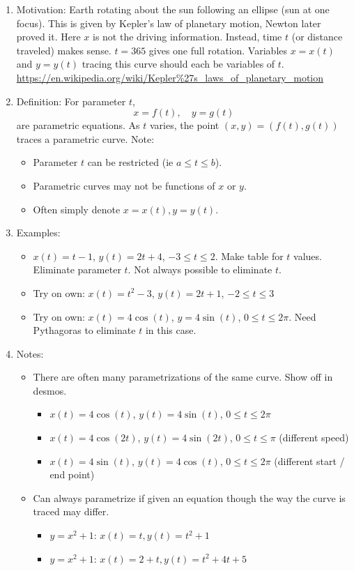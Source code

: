 \documentclass{article}
\begin{document}
\begin{enumerate}
\item Motivation: Earth rotating about the sun following an ellipse (sun at one focus). This is given by Kepler's law of planetary motion, Newton later proved it. Here $x$ is not the driving information. Instead, time $t$ (or distance traveled) makes sense. $t=365$ gives one full rotation. Variables $x=x(t)$ and $y=y(t)$ tracing this curve should each be variables of $t$.
\url{https://en.wikipedia.org/wiki/Kepler%27s_laws_of_planetary_motion}

\item Definition: For parameter $t$, 
\[
x = f(t), \quad y=g(t)
\]
are parametric equations. As $t$ varies, the point $(x,y)=(f(t),g(t))$ traces a parametric curve. Note:
\begin{itemize} 
\item Parameter $t$ can be restricted (ie $a \leq t \leq b$).
\item Parametric curves may not be functions of $x$ or $y$.
\item Often simply denote $x=x(t), y=y(t)$.
\end{itemize}

\item Examples:
\begin{itemize}
\item $x(t)=t-1$, $y(t)=2t+4$, $-3 \leq t \leq 2$. Make table for $t$ values. Eliminate parameter $t$. Not always possible to eliminate $t$. 
\item Try on own: $x(t) = t^2-3$, $y(t)=2t+1$, $-2 \leq t \leq 3$
\item Try on own: $x(t) = 4 \cos(t)$, $y=4\sin(t)$, $0 \leq t \leq 2\pi$. Need Pythagoras to eliminate $t$ in this case.
\end{itemize}

\item Notes: 
\begin{itemize}
\item There are often many parametrizations of the same curve. Show off in desmos.
\begin{itemize}
\item $x(t)=4\cos(t)$, $y(t)=4\sin(t)$, $0 \leq t \leq 2\pi$
\item $x(t)=4\cos(2t)$, $y(t)=4\sin(2t)$, $0 \leq t \leq \pi$ (different speed)
\item $x(t)=4\sin(t)$, $y(t)=4\cos(t)$, $0 \leq t \leq 2\pi$ (different start / end point)
\end{itemize}
\item Can always parametrize if given an equation though the way the curve is traced may differ.
\begin{itemize}
\item $y=x^2+1$: $x(t)=t, y(t)=t^2+1$
\item $y=x^2+1$: $x(t)=2+t, y(t)=t^2+4t+5$
\end{itemize}
\end{itemize}


\end{enumerate}
\end{document}
